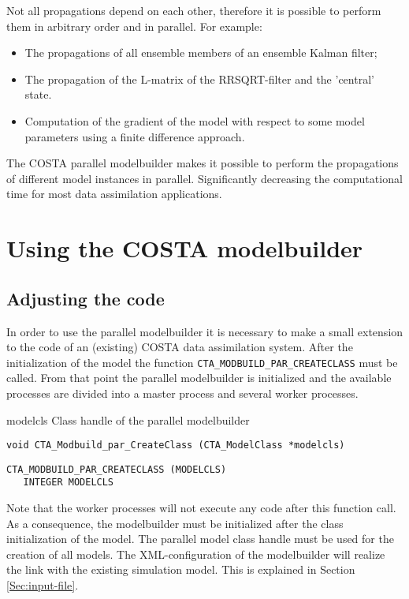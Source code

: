 \documentclass[a4paper,12pt]{article}
\begin{document}
Not all propagations depend on each other, therefore it is possible to
perform them in arbitrary order and in parallel. For example:
\begin{itemize}
\item The propagations of all ensemble members of an ensemble Kalman filter; 
\item The propagation of the L-matrix of the RRSQRT-filter and the 
      'central' state.
\item Computation of the gradient of the model with respect to some model
      parameters using a finite difference approach.
\end{itemize}

The COSTA parallel modelbuilder makes it possible to perform the
propagations of different model instances in parallel. Significantly decreasing
the computational time for most data assimilation applications.

\section{Using the COSTA modelbuilder} \label{Sec:Using the COSTA modelbuilder}
\subsection{Adjusting the code}
In order to use the parallel modelbuilder it is necessary to make a small
extension to the code of an (existing) COSTA data assimilation system.
After the initialization of the model the function 
{\tt CTA\_MODBUILD\_PAR\_CREATECLASS} must be called. From that
point the parallel modelbuilder is initialized and the available processes
are divided into  a master process and several worker processes.

\horzline
\begin{tabbing}
\functab
{}
 {modelcls}  {Class handle of the parallel modelbuilder }\\
\end{tabbing}
\horzline

\begin{verbatim}
void CTA_Modbuild_par_CreateClass (CTA_ModelClass *modelcls)
\end{verbatim}

\begin{verbatim}
CTA_MODBUILD_PAR_CREATECLASS (MODELCLS)
   INTEGER MODELCLS
\end{verbatim}

Note that the worker processes will not execute any code after this function
call. As a consequence, the modelbuilder must be initialized after the
class initialization of the model. The parallel model class handle must be
used for the creation of all models. The XML-configuration of the
modelbuilder will realize the link with the existing simulation model. This is
explained in Section \ref{Sec:input-file}. 
\end{document}
